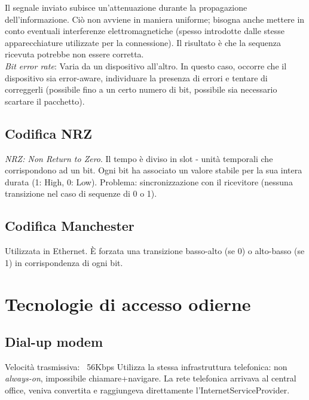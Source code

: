 Il segnale inviato subisce un'attenuazione durante la propagazione dell'informazione.
Ciò non avviene in maniera uniforme; bisogna anche mettere in conto eventuali interferenze elettromagnetiche (spesso introdotte dalle stesse apparecchiature utilizzate per la connessione). Il risultato è che la sequenza ricevuta potrebbe non essere corretta.\\
\textit{Bit error rate}: Varia da un dispositivo all'altro.
In questo caso, occorre che il dispositivo sia error-aware, individuare la presenza di errori e tentare di correggerli (possibile fino a un certo numero di bit, possibile sia necessario scartare il pacchetto).

\subsection{Codifica NRZ}
\textit{NRZ: Non Return to Zero}. Il tempo è diviso in slot - unità temporali che corrispondono ad un bit.
Ogni bit ha associato un valore stabile per la sua intera durata (1: High, 0: Low).
Problema: sincronizzazione con il ricevitore (nessuna transizione nel caso di sequenze di 0 o 1).
\subsection{Codifica Manchester}
Utilizzata in Ethernet.
È forzata una transizione basso-alto (se 0) o alto-basso (se 1) in corrispondenza di ogni bit.

\section{Tecnologie di accesso odierne}
\subsection{Dial-up modem}
Velocità trasmissiva: ~56Kbps
Utilizza la stessa infrastruttura telefonica: non \textit{always-on}, impossibile chiamare+navigare.
La rete telefonica arrivava al central office, veniva convertita e raggiungeva direttamente l'InternetServiceProvider.

